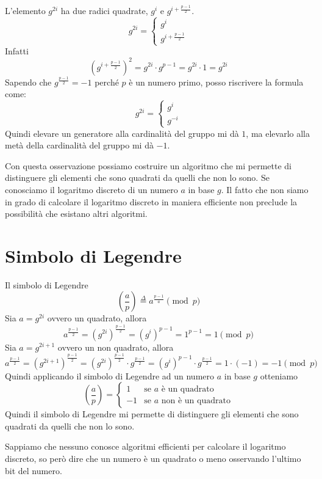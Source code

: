 L'elemento $g^{2i}$ ha due radici quadrate, $g^{i}$ e $g^{i + \frac{p-1}{2}}$.
\[
  g^{2i} =
\begin{cases}
  g^{i} \\
  g^{i + \frac{p-1}{2}} 
\end{cases}
\]
Infatti
\[
  \left( g^{i + \frac{p-1}{2}}\right)^2 = g^{2i}\cdot g^{p-1} = g^{2i} \cdot 1 = g^{2i}
\]
Sapendo che $g^{\frac{p-1}{2}} = -1$ perché $p$ è un numero primo, posso riscrivere la formula come: 
\[
g^{2i} = 
\begin{cases}
  g^{i} \\
  g^{-i}
\end{cases}
\]
Quindi elevare un generatore alla cardinalità del gruppo mi dà $1$, ma 
elevarlo alla metà della cardinalità del gruppo mi dà $-1$.

Con questa osservazione possiamo costruire un algoritmo che mi permette di
distinguere gli elementi che sono quadrati da quelli che non lo sono.
Se conosciamo il logaritmo discreto di un numero $a$ in base $g$. Il fatto 
che non siamo in grado di calcolare il logaritmo discreto in maniera efficiente
non preclude la possibilità che esistano altri algoritmi. 

\section{Simbolo di Legendre}
Il simbolo di Legendre
\[
  \left(\frac{a}{p}\right) \stackrel{\Delta}{=}
  a^{\frac{p-1}{a}} \pmod p
\]
Sia $a = g^{2i}$ ovvero un quadrato, allora
\[
  a^{\frac{p-1}{2}}= (g^{2i})^{\frac{p-1}{2}} = (g^{i})^{p-1} = 
  1^{p-1} = 1 \pmod p
\]
Sia $a = g^{2i + 1}$ ovvero un non quadrato, allora
\[
  a^{\frac{p-1}{2}}= (g^{2i + 1})^{\frac{p-1}{2}} = (g^{2i})^{\frac{p-1}{2}}
  \cdot g^{\frac{p-1}{2}} = (g^{i})^{p-1} \cdot g^{\frac{p-1}{2}} = 
  1 \cdot (-1) = -1 \pmod p
\]
Quindi applicando il simbolo di Legendre ad un numero $a$ in base $g$ otteniamo
\[
  \left(\frac{a}{p}\right) = 
  \begin{cases}
    1 & \text{se $a$ è un quadrato} \\
    -1 & \text{se $a$ non è un quadrato}
  \end{cases}
\]
Quindi il simbolo di Legendre mi permette di distinguere gli elementi che sono
quadrati da quelli che non lo sono.

Sappiamo che nessuno conosce algoritmi efficienti per calcolare il
logaritmo discreto, so però dire che un numero è un quadrato o meno osservando 
l'ultimo bit del numero.

